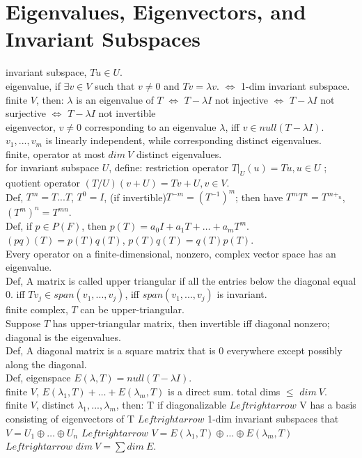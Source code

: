 \documentclass[paper=a4, fontsize=11pt]{scrartcl} %
\numberwithin{equation}{section} %
\numberwithin{figure}{section} %
\numberwithin{table}{section} %
\begin{document}
\section{Eigenvalues, Eigenvectors, and Invariant Subspaces}
invariant subspace, $Tu\in U$.\\
eigenvalue, if $\exists v\in V$ such that $v\neq 0$ and $Tv=\lambda v$. $\Leftrightarrow$ 1-dim invariant subspace.\\
finite $V$, then: $\lambda$ is an eigenvalue of $T$ $\Leftrightarrow$ $T-\lambda I$ not injective $\Leftrightarrow$ $T-\lambda I$ not surjective $\Leftrightarrow$ $T-\lambda I$ not invertible\\
eigenvector, $v\neq 0$ corresponding to an eigenvalue $\lambda$, iff $v\in null(T-\lambda I)$.\\
$v_1,...,v_m$ is linearly independent, while corresponding distinct eigenvalues.\\
finite, operator at most $dim\ V$ distinct eigenvalues.\\
for invariant subspace $U$, define: restriction operator $T|_U(u) =Tu, u\in U$ ; quotient operator $(T/U)(v+U) = Tv+U, v\in V$.\\
Def, $T^m=T...T$, $T^0=I$, (if invertible)$T^{-m}= (T^{-1})^m$; then have $T^mT^n=T^{m+_n}$, $(T^m)^n=T^{mn}$.\\
Def, if $p\in P(F)$, then $p(T)=a_0I+a_1T+\dots+a_mT^m$. $(pq)(T)=p(T)q(T)$, $p(T)q(T)=q(T)p(T)$.\\
Every operator on a finite-dimensional, nonzero, complex vector space has an eigenvalue.\\
Def, A matrix is called upper triangular if all the entries below the diagonal equal 0. iff $Tv_j\in span(v_1,...,v_j)$, iff $span(v_1,...,v_j)$ is invariant.\\
finite complex, $T$ can be upper-triangular.\\
Suppose $T$ has upper-triangular matrix, then invertible iff diagonal nonzero; diagonal is the eigenvalues.\\
Def, A diagonal matrix is a square matrix that is 0 everywhere except possibly along the diagonal.\\
Def, eigenspace $E(\lambda, T)=null(T-\lambda I)$.\\
finite $V$, $E(\lambda_1, T)+\dots+E(\lambda_m, T)$ is a direct sum. total dims $\leq$ $dim\ V$.\\
finite $V$, distinct $\lambda_1,...,\lambda_m$, then: T if diagonalizable $Leftrightarrow$ V has a basis consisting of eigenvectors of T $Leftrightarrow$ 1-dim invariant subspaces that $V=U_1\oplus\dots\oplus U_n$ $Leftrightarrow$ $V= E(\lambda_1,T)\oplus\dots\oplus E(\lambda_m,T)$ $Leftrightarrow$ $dim\ V= \sum dim\ E$.\\
\end{document}
